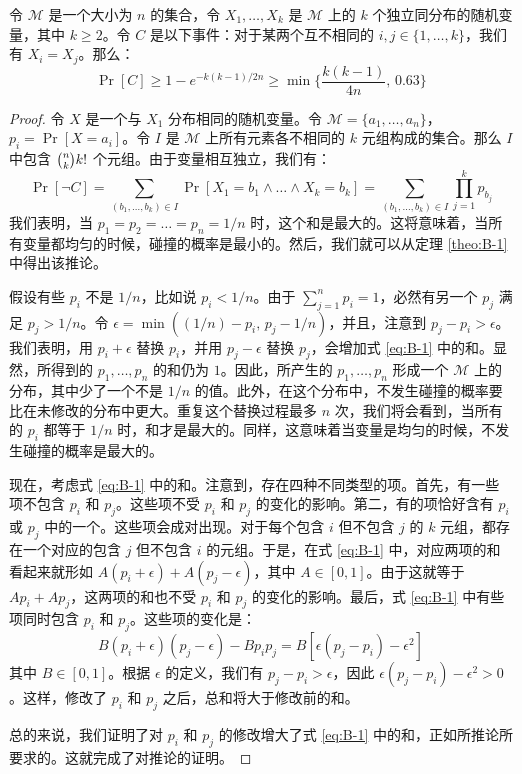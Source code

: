 \begin{corollary}\label{cor:B-2}
令 $\mathcal{M}$ 是一个大小为 $n$ 的集合，令 $X_1,\dots,X_k$ 是 $\mathcal{M}$ 上的 $k$ 个独立同分布的随机变量，其中 $k\geq 2$。令 $C$ 是以下事件：对于某两个互不相同的 $i,j\in\{1,\dots,k\}$，我们有 $X_i=X_j$。那么：
\[
\Pr[C]\geq 1-e^{-k(k-1)/2n}\geq\min\bigg\{\frac{k(k-1)}{4n},\,0.63\bigg\}
\]
\end{corollary}

\begin{proof}
令 $X$ 是一个与 $X_1$ 分布相同的随机变量。令 $\mathcal{M}=\{a_1,\dots,a_n\}$，$p_i=\Pr[X=a_i]$。令 $I$ 是 $\mathcal{M}$ 上所有元素各不相同的 $k$ 元组构成的集合。那么 $I$ 中包含 $\tbinom{n}{k}k!$ 个元组。由于变量相互独立，我们有：
\begin{equation}\label{eq:B-1}
\Pr[\lnot C]
=\sum_{(b_1,\dots,b_k)\in I}\Pr[X_1=b_1\land\dots\land X_k=b_k]
=\sum_{(b_1,\dots,b_k)\in I}\prod_{j=1}^k p_{b_j}
\end{equation}
我们表明，当 $p_1=p_2=\dots=p_n=1/n$ 时，这个和是最大的。这将意味着，当所有变量都均匀的时候，碰撞的概率是最小的。然后，我们就可以从定理 \ref{theo:B-1} 中得出该推论。

假设有些 $p_i$ 不是 $1/n$，比如说 $p_i<1/n$。由于 $\sum^n_{j=1}p_i=1$，必然有另一个 $p_j$ 满足 $p_j>1/n$。令 $\epsilon=\min((1/n)-p_i,\,p_j-1/n)$，并且，注意到 $p_j-p_i>\epsilon$。我们表明，用 $p_i+\epsilon$ 替换 $p_i$，并用 $p_j-\epsilon$ 替换 $p_j$，会增加式 \ref{eq:B-1} 中的和。显然，所得到的 $p_1,\dots,p_n$ 的和仍为 $1$。因此，所产生的 $p_1,\dots,p_n$ 形成一个 $\mathcal{M}$ 上的分布，其中少了一个不是 $1/n$ 的值。此外，在这个分布中，不发生碰撞的概率要比在未修改的分布中更大。重复这个替换过程最多 $n$ 次，我们将会看到，当所有的 $p_i$ 都等于 $1/n$ 时，和才是最大的。同样，这意味着当变量是均匀的时候，不发生碰撞的概率是最大的。

现在，考虑式 \ref{eq:B-1} 中的和。注意到，存在四种不同类型的项。首先，有一些项不包含 $p_i$ 和 $p_j$。这些项不受 $p_i$ 和 $p_j$ 的变化的影响。第二，有的项恰好含有 $p_i$ 或 $p_j$ 中的一个。这些项会成对出现。对于每个包含 $i$ 但不包含 $j$ 的 $k$ 元组，都存在一个对应的包含 $j$ 但不包含 $i$ 的元组。于是，在式 \ref{eq:B-1} 中，对应两项的和看起来就形如 $A(p_i+\epsilon)+A(p_j-\epsilon)$，其中 $A\in[0,1]$。由于这就等于 $Ap_i+Ap_j$，这两项的和也不受 $p_i$ 和 $p_j$ 的变化的影响。最后，式 \ref{eq:B-1} 中有些项同时包含 $p_i$ 和 $p_j$。这些项的变化是：
\[
B(p_i+\epsilon)(p_j-\epsilon)-Bp_ip_j=B[\epsilon(p_j-p_i)-\epsilon^2]
\]
其中 $B\in[0,1]$。根据 $\epsilon$ 的定义，我们有 $p_j-p_i>\epsilon$，因此 $\epsilon(p_j-p_i)-\epsilon^2>0$。这样，修改了 $p_i$ 和 $p_j$ 之后，总和将大于修改前的和。

总的来说，我们证明了对 $p_i$ 和 $p_j$ 的修改增大了式 \ref{eq:B-1} 中的和，正如所推论所要求的。这就完成了对推论的证明。
\end{proof}

